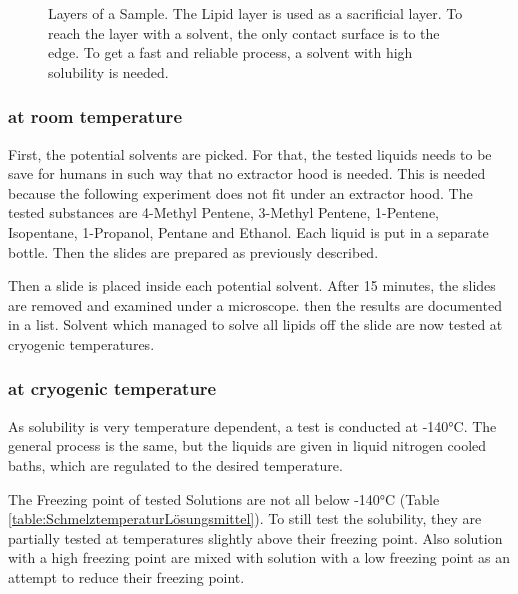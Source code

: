 \begin{figure}[hbt!]
	\centering
	
	\caption{Layers of a Sample. The Lipid layer is used as a sacrificial layer. To reach the layer with a solvent, the only contact surface is to the edge. To get a fast and reliable process, a solvent with high solubility is needed.}
	\label{fig:sacrificial layer}
\end{figure}


\subsubsection{at room temperature}

First, the potential solvents are picked. For that, the tested liquids needs to be save for humans in such way that no extractor hood is needed. This is needed because the following experiment does not fit under an extractor hood. The tested substances are 4-Methyl Pentene, 3-Methyl Pentene, 1-Pentene, Isopentane, 1-Propanol, Pentane and Ethanol. Each liquid is put in a separate bottle. Then the slides are prepared  as previously described.

Then a slide is placed inside each potential solvent. After 15 minutes, the slides are removed and examined under a microscope. then the results are documented in a list. Solvent which managed to solve all lipids off the slide are now tested at cryogenic temperatures.

\subsubsection{at cryogenic temperature}
\label{chapter:meltingtemp}

As solubility is very temperature dependent, a test is conducted at -140°C. The general process is the same, but the liquids are given in liquid nitrogen cooled baths, which are regulated to the desired temperature. 

The Freezing point of tested Solutions are not all below -140°C (Table \ref{table:SchmelztemperaturLösungsmittel}).
To still test the solubility, they are partially tested at temperatures slightly above their freezing point. Also solution with a high freezing point are mixed with solution with a low freezing point as an attempt to reduce their freezing point.

